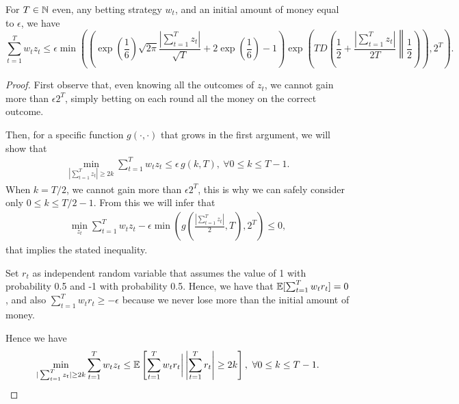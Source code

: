 \begin{theorem}
For $T \in \mathbb{N}$ even, any betting strategy $w_t$, and an initial amount of money equal to $\epsilon$, we have
\[
\sum_{t=1}^T w_t z_t 
\leq \epsilon \min\left(\left(\exp\left(\frac{1}{6}\right)\sqrt{2 \pi}\frac{|\sum_{t=1}^T z_t|}{\sqrt{T}} +2\exp\left(\frac{1}{6}\right)-1\right) \exp\left(T D\left(\frac{1}{2}+\frac{|\sum_{t=1}^T z_t|}{2T}\middle\|\frac{1}{2}\right)\right), 2^T\right).
\]
\end{theorem}
\begin{proof}
First observe that, even knowing all the outcomes of $z_t$, we cannot gain more than $\epsilon 2^T$, simply betting on each round all the money on the correct outcome.

Then, for a specific function $g(\cdot,\cdot)$ that grows in the first argument, we will show that
\begin{align*}
\min_{|\sum_{t=1}^T z_t| \geq 2 k} \sum_{t=1}^T w_t z_t 
\leq \epsilon \, g(k,T), \ \forall 0 \leq k \leq T-1.
\end{align*}
When $k=T/2$, we cannot gain more than $\epsilon 2^T$, this is why we can safely consider only $0\leq k\leq T/2-1$.
From this we will infer that
\begin{align*}
\min_{z_t} \sum_{t=1}^T w_t z_t - \epsilon\min\left(g\left(\frac{|\sum_{t=1}^T z_t|}{2},T\right),2^T\right) \leq 0,
\end{align*}
that implies the stated inequality.

Set $r_t$ as independent random variable that assumes the value of 1 with probability 0.5 and -1 with probability 0.5.
Hence, we have that $\mathbb{E}[ \sum_{t=1}^T w_t r_t ]=0$, and also $\sum_{t=1}^T w_t r_t \geq -\epsilon$ because we never lose more than the initial amount of money.

Hence we have
\begin{align*}
\min_{|\sum_{t=1}^T z_t| \geq 2 k} \sum_{t=1}^T w_t z_t 
\leq \mathbb{E}\left[\sum_{t=1}^T w_t r_t \bigg| \left|\sum_{t=1}^T r_t\right| \geq 2 k\right], \ \forall 0 \leq k \leq T-1.
\end{align*}


\end{proof}
